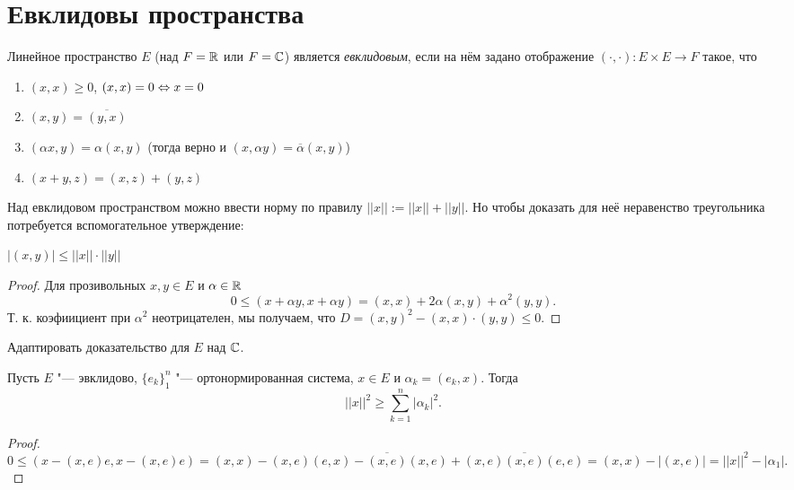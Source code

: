 \documentclass[main]{subfiles}
\begin{document}
\section{Евклидовы пространства}
\begin{definition}
  Линейное пространство \( E \) (над \( F = \mathbb{R} \) или \( F = \mathbb{C} \))
  является \emph{евклидовым}, если на нём задано отображение
  \( (\cdot, \cdot) : E \times E \to F \) такое, что
  \begin{enumerate}
    \item \( (x, x) \ge 0 \), \( (x, x) = 0 \Leftrightarrow x = 0 \)
    \item \( (x, y) = \overline{(y, x)} \)
    \item \( (\alpha x, y) = \alpha (x, y) \)
      (тогда верно и \( (x, \alpha y) = \overline{\alpha} (x, y) \))
    \item \( (x + y, z) = (x, z) + (y, z) \)
  \end{enumerate}
\end{definition}

Над евклидовом пространством можно ввести норму
по правилу \( ||x|| := ||x|| + ||y|| \).
Но чтобы доказать для неё неравенство треугольника
потребуется вспомогательное утверждение:

\begin{lemma}
  \( |(x, y)| \le ||x|| \cdot ||y|| \)
\end{lemma}
\begin{proof}
  Для прозивольных \( x, y \in E \) и \( \alpha \in \mathbb{R} \)
  \[ 0 \le (x + \alpha y, x + \alpha y) =
  (x, x) + 2 \alpha (x, y) + \alpha^2 (y, y). \]
  Т. к. коэфиициент при \( \alpha^2 \) неотрицателен,
  мы получаем, что \( D = (x, y)^2 - (x, x) \cdot (y, y) \le 0 \).
\end{proof}

\begin{exercise}
  Адаптировать доказательство для \( E \) над \( \mathbb{C} \).
\end{exercise}

\begin{theorem}
  Пусть \( E \) "--- эвклидово, \( \{ e_k \}_1^n \) "--- ортонормированная система,
  \( x \in E \) и \( \alpha_k = (e_k, x) \). Тогда
  \[ ||x||^2 \ge \sum_{k = 1}^{n} |\alpha_k|^2. \]
\end{theorem}
\begin{proof}
  \[ 0 \le (x - (x, e) e, x - (x, e) e) =
    (x, x) - (x, e) (e, x) - \overline{(x, e)} (x, e) + (x, e)\overline{(x, e)}(e, e) =
  (x, x) - |(x, e)| = ||x||^2 - |\alpha_1|. \]
\end{proof}
\end{document}
